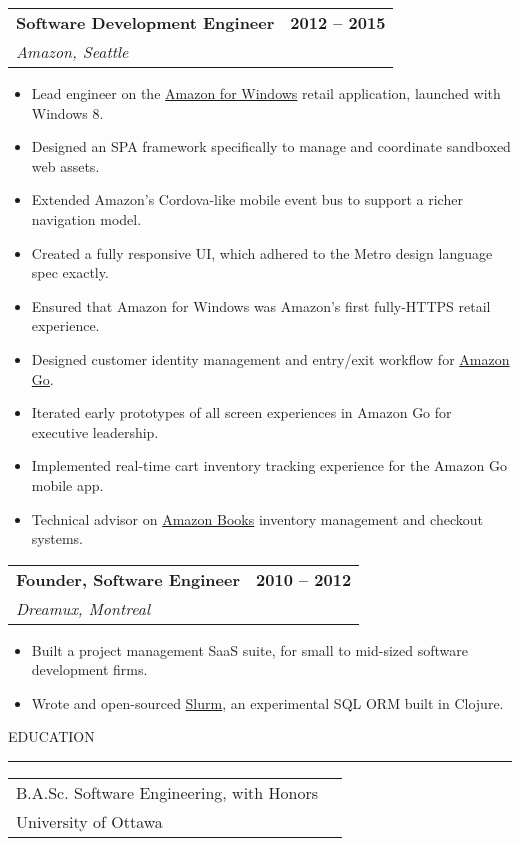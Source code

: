 \documentclass[12pt]{article}
\makeatletter
\newenvironment{justifycolumns}
{\begin{tabular*}{\textwidth}{@{\extracolsep{\fill}}lr@{}}}
{\end{tabular*}}
\newcommand{\row}[2]{#1 & #2 \\}
\newcommand{\rowheading}[2]{\row{\textbf{#1}}{\textbf{#2}}}
\newcommand{\range}[2]{#1 -- #2}
\newcommand{\blockseparation}{\vspace{0.13in}}
\newcommand{\heading}[1]{
	\vspace{0.05in}
	\uppercase{#1}
	\vspace{0.05in}
	\hrule
	\blockseparation
}
\newenvironment{tightbullets}
{\begin{itemize}}
{\end{itemize}}
\newenvironment{bullets}
{\begin{tightbullets}}
{\end{tightbullets} \blockseparation}
\makeatother
\begin{document}
\begin{flushleft}
\begin{justifycolumns}
	\hspace{0.1in}
	\rowheading{Software Development Engineer}{\range{2012}{2015}}
	\hspace{0.1in}
	\row{\emph{Amazon, Seattle}}{}
\end{justifycolumns}
\begin{bullets}
	\item Lead engineer on the \href{http://apps.microsoft.com/windows/en-us/app/amazon/80299018-3dee-418d-8466-374fe9463309}{Amazon for Windows} retail application, launched with Windows 8.
	\item Designed an SPA framework specifically to manage and coordinate sandboxed web assets.
	\item Extended Amazon’s Cordova-like mobile event bus to support a richer navigation model.
	\item Created a fully responsive UI, which adhered to the Metro design language spec exactly.
	\item Ensured that Amazon for Windows was Amazon's first fully-HTTPS retail experience.
	\item Designed customer identity management and entry/exit workflow for \href{https://www.amazon.com/b?ie=UTF8\&node=16008589011}{Amazon Go}.
	\item Iterated early prototypes of all screen experiences in Amazon Go for executive leadership.
	\item Implemented real-time cart inventory tracking experience for the Amazon Go mobile app.
	\item Technical advisor on \href{https://www.amazon.com/amazon-books-university-village-seattle-washington/b?ie=UTF8\&node=17750359011}{Amazon Books} inventory management and checkout systems.
\end{bullets}
\vspace{0.05in}

\begin{justifycolumns}
	\hspace{0.1in}
	\rowheading{Founder, Software Engineer}{\range{2010}{2012}}
	\hspace{0.1in}
	\row{\emph{Dreamux, Montreal}}{}
\end{justifycolumns}
\begin{bullets}
	\item Built a project management SaaS suite, for small to mid-sized software development firms.
	\item Wrote and open-sourced \href{https://github.com/amcnamara/slurm}{Slurm}, an experimental SQL ORM built in Clojure.
\end{bullets}

\blockseparation

\heading{Education}
\begin{justifycolumns}
	\row{B.A.Sc. Software Engineering, with Honors}{}
	\row{University of Ottawa}{}
\end{justifycolumns}


\end{flushleft}
\end{document}
